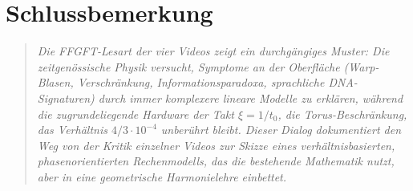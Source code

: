 \section*{Schlussbemerkung}

\begin{quote}
\itshape
Die FFGFT-Lesart der vier Videos zeigt ein durchg\"angiges Muster: Die zeitgen\"ossische Physik versucht, Symptome an der Oberfl\"ache (Warp-Blasen, Verschr\"ankung, Informationsparadoxa, sprachliche DNA-Signaturen) durch immer komplexere lineare Modelle zu erkl\"aren, w\"ahrend die zugrundeliegende Hardware \textendash{} der Takt $\xi = 1/t_0$, die Torus-Beschr\"ankung, das Verh\"altnis $4/3 \cdot 10^{-4}$ \textendash{} unber\"uhrt bleibt. Dieser Dialog dokumentiert den Weg von der Kritik einzelner Videos zur Skizze eines verh\"altnisbasierten, phasenorientierten Rechenmodells, das die bestehende Mathematik nutzt, aber in eine geometrische Harmonielehre einbettet.
\end{quote}


